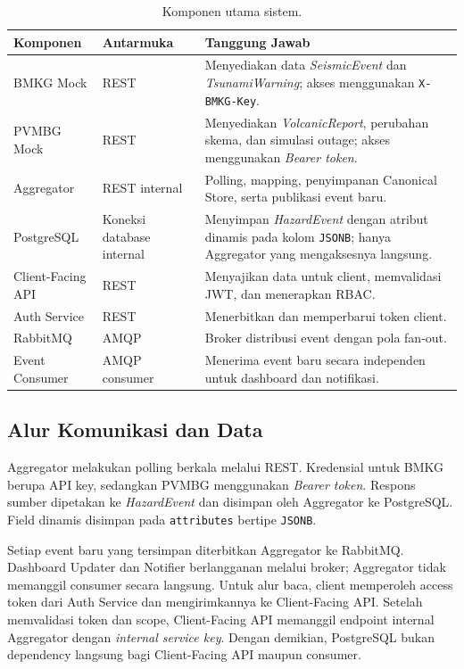 \begin{table}[H]
  \centering
  \caption{Komponen utama sistem.}
  \label{tab:komponen}
  \begin{tabularx}{\textwidth}{@{}p{}p{}X@{}}
    \toprule
    \textbf{Komponen} & \textbf{Antarmuka} & \textbf{Tanggung Jawab} \\
    \midrule
    BMKG Mock & REST & Menyediakan data \textit{SeismicEvent} dan
    \textit{TsunamiWarning}; akses menggunakan \texttt{X-BMKG-Key}. \\
    PVMBG Mock & REST & Menyediakan \textit{VolcanicReport},
    perubahan skema, dan simulasi outage; akses menggunakan \textit{Bearer token}. \\
    Aggregator & REST internal & Polling, mapping, penyimpanan
    Canonical Store, serta publikasi event baru. \\
    PostgreSQL & Koneksi database internal & Menyimpan \textit{HazardEvent}
    dengan atribut dinamis pada kolom \texttt{JSONB}; hanya Aggregator yang
    mengaksesnya langsung. \\
    Client-Facing API & REST & Menyajikan data untuk client,
    memvalidasi JWT, dan menerapkan RBAC. \\
    Auth Service & REST & Menerbitkan dan memperbarui token client. \\
    RabbitMQ & AMQP & Broker distribusi event dengan pola fan-out. \\
    Event Consumer & AMQP consumer & Menerima event baru secara
    independen untuk dashboard dan notifikasi. \\
    \bottomrule
  \end{tabularx}
\end{table}

\subsection{Alur Komunikasi dan Data}

Aggregator melakukan polling berkala melalui REST. Kredensial untuk BMKG berupa
API key, sedangkan PVMBG menggunakan \textit{Bearer token}. Respons sumber
dipetakan ke \textit{HazardEvent} dan disimpan oleh Aggregator ke PostgreSQL.
Field dinamis disimpan pada \texttt{attributes} bertipe \texttt{JSONB}.

Setiap event baru yang tersimpan diterbitkan Aggregator ke RabbitMQ. Dashboard
Updater dan Notifier berlangganan melalui broker; Aggregator tidak memanggil
consumer secara langsung. Untuk alur baca, client memperoleh access token dari
Auth Service dan mengirimkannya ke Client-Facing API. Setelah memvalidasi token
dan scope, Client-Facing API memanggil endpoint internal Aggregator dengan
\textit{internal service key}. Dengan demikian, PostgreSQL bukan dependency
langsung bagi Client-Facing API maupun consumer.

